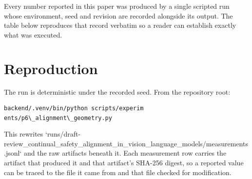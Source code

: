 \documentclass[10pt,twocolumn,letterpaper]{article}
\begin{document}
Every number reported in this paper was produced by a single scripted run whose environment, seed and revision are recorded alongside its output. The table below reproduces that record verbatim so a reader can establish exactly what was executed.
\begin{table}[htbp]
\centering
{}
\end{table}


\section{Reproduction}


The run is deterministic under the recorded seed. From the repository root:


\begin{scriptsize}
\begin{verbatim}
backend/.venv/bin/python scripts/experim
ents/p6\_alignment\_geometry.py
\end{verbatim}
\end{scriptsize}


This rewrites `runs/draft-review\_continual\_safety\_alignment\_in\_vision\_language\_models/measurements.jsonl` and the raw artifacts beneath it. Each measurement row carries the artifact that produced it and that artifact's SHA-256 digest, so a reported value can be traced to the file it came from and that file checked for modification.
\end{document}
